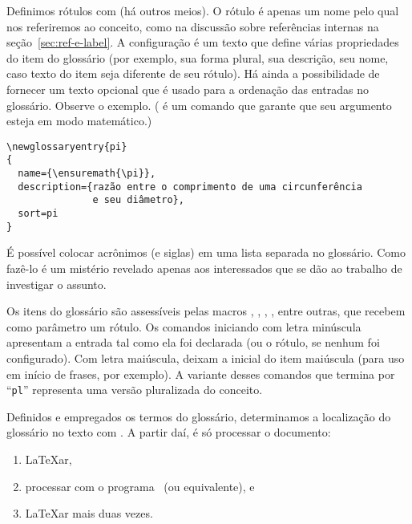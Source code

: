 Definimos rótulos com
(há outros meios). O rótulo é apenas um nome pelo qual nos referiremos
ao conceito, como na discussão sobre referências internas na
seção~\ref{sec:ref-e-label}. A configuração é um texto que define
várias propriedades do item do glossário (por exemplo, sua forma plural, sua
descrição, seu nome, caso texto do item seja diferente de seu
rótulo). Há ainda a possibilidade de fornecer um texto opcional que é
usado para a ordenação das entradas no glossário. Observe o
exemplo. ( é um comando que garante que seu
argumento esteja em modo matemático.)

\begin{verbatim}
\newglossaryentry{pi}
{
  name={\ensuremath{\pi}},
  description={razão entre o comprimento de uma circunferência 
               e seu diâmetro},
  sort=pi
}
\end{verbatim}

É possível colocar acrônimos (e siglas) em uma lista separada no
glossário. Como fazê-lo é um mistério revelado apenas aos interessados
que se dão ao trabalho de investigar o assunto.

Os itens do glossário são  assessíveis pelas macros
, , , ,
entre outras, que recebem como parâmetro um rótulo. Os comandos
iniciando com letra minúscula apresentam a entrada tal como ela foi
declarada (ou o rótulo, se nenhum  foi
configurado). Com letra maiúscula, deixam a inicial do item maiúscula
(para uso em início de frases, por exemplo). A variante desses
comandos que termina por ``{\tt pl}'' representa uma versão
pluralizada do conceito.

Definidos e empregados os termos do glossário, determinamos a
localização do glossário no texto com . A
partir daí, é só processar o documento:
\begin{enumerate}
\item \LaTeX ar,
\item processar com o programa~ (ou
  equivalente), e
\item \LaTeX ar mais duas vezes.
\end{enumerate}
